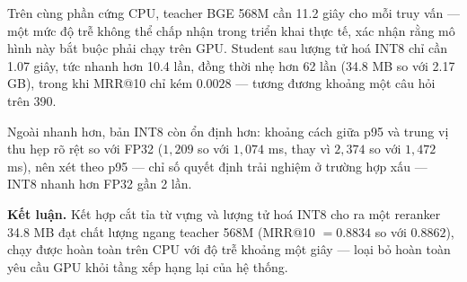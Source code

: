 \documentclass[../DoAn.tex]{subfiles}
\begin{document}
\begin{table}[H]
    \centering
    \caption{Độ trễ trên CPU (16 luồng, rerank top-20)}
    \label{tab:cpu-deployment}
    {\small
    \setlength{\tabcolsep}{4pt}
    }
\end{table}

Trên cùng phần cứng CPU, teacher BGE 568M cần 11.2 giây cho mỗi truy vấn --- một mức độ trễ không thể chấp nhận trong triển khai thực tế, xác nhận rằng mô hình này bắt buộc phải chạy trên GPU. Student sau lượng tử hoá INT8 chỉ cần 1.07 giây, tức nhanh hơn 10.4 lần, đồng thời nhẹ hơn 62 lần (34.8 MB so với 2.17 GB), trong khi MRR@10 chỉ kém $0.0028$ --- tương đương khoảng một câu hỏi trên 390.

Ngoài nhanh hơn, bản INT8 còn ổn định hơn: khoảng cách giữa p95 và trung vị thu hẹp rõ rệt so với FP32 ($1{,}209$ so với $1{,}074$ ms, thay vì $2{,}374$ so với $1{,}472$ ms), nên xét theo p95 --- chỉ số quyết định trải nghiệm ở trường hợp xấu --- INT8 nhanh hơn FP32 gần 2 lần.

\noindent\textbf{Kết luận.} Kết hợp cắt tỉa từ vựng và lượng tử hoá INT8 cho ra một reranker 34.8 MB đạt chất lượng ngang teacher 568M (MRR@10 $=0.8834$ so với $0.8862$), chạy được hoàn toàn trên CPU với độ trễ khoảng một giây --- loại bỏ hoàn toàn yêu cầu GPU khỏi tầng xếp hạng lại của hệ thống.
\end{document}
